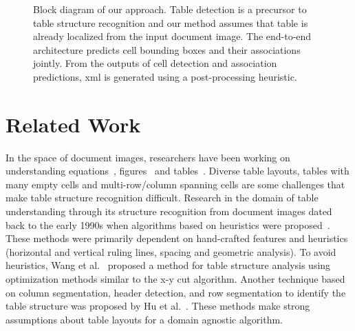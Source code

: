\documentclass[runningheads]{llncs}
\begin{document}
\begin{figure*}[t]
\begin{center}
\end{center}
\caption{Block diagram of our approach. Table detection is a precursor to table structure recognition and our method assumes that table is already localized from the input document image. The end-to-end architecture predicts cell bounding boxes and their associations jointly. From the outputs of cell detection and association predictions, {\sc xml} is generated using a post-processing heuristic.}
\label{fig_block}
\end{figure*}

\section{Related Work} \label{related_work}

In the space of document images, researchers have been working on understanding equations~\cite{zanibbi2002recognizing,zhang2018multi}, figures~\cite{siegel2016figureseer,deepchart} and tables~\cite{nishida2017understanding,schreiber2017deepdesrt,bao2018table,qasim2019rethinking,table_splitting,li2019tablebank,paliwal2019tablenet,zhong2019image,chi2019complicated,Khan_2019,Siddiqui2019Rethinking,xue2019res2tim}. Diverse table layouts, tables with many empty cells and multi-row/column spanning cells are some challenges that make table structure recognition difficult. 
Research in the domain of table understanding through its structure recognition from document images dated back to the early 1990s when algorithms based on heuristics were proposed~\cite{itonori1993table,green1995recognition,kieninger1998table,tupaj1996extracting,harit2012table,gatos2005automatic,ohta2019cell}. These methods were primarily dependent on hand-crafted features and heuristics (horizontal and vertical ruling lines, spacing and geometric analysis). To avoid heuristics, Wang et al.~\cite{wang2004table} proposed a method for table structure analysis using optimization methods similar to the {\sc x}-{\sc y} cut algorithm. Another technique based on column segmentation, header detection, and row segmentation to identify the table structure was proposed by Hu et al.~\cite{hu1999medium}. These methods make strong assumptions about table layouts for a domain agnostic algorithm.
\end{document}
